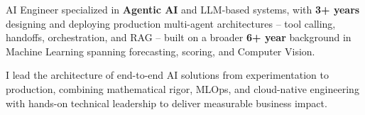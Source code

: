 %
%
%
\par{
AI Engineer specialized in \textbf{Agentic AI} and LLM-based systems, with \textbf{3+ years} designing and deploying production multi-agent architectures -- tool calling, handoffs, orchestration, and RAG -- built on a broader \textbf{6+ year} background in Machine Learning spanning forecasting, scoring, and Computer Vision.
}
\par{
I lead the architecture of end-to-end AI solutions from experimentation to production, combining mathematical rigor, MLOps, and cloud-native engineering with hands-on technical leadership to deliver measurable business impact.
}
\vspace{1em}